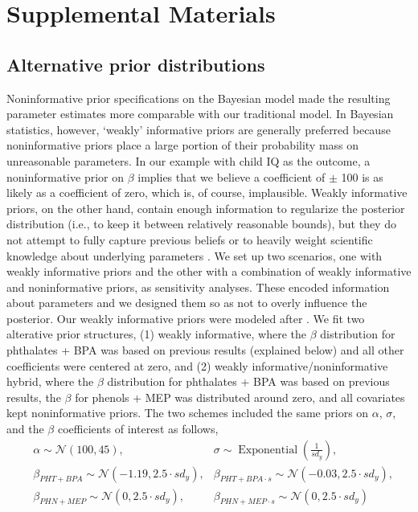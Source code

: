 \clearpage
{\setcounter{figure}{0} %
\setcounter{table}{0}
\renewcommand{\thefigure}{4.S.\arabic{figure}}
\renewcommand{\thetable}{4.S.\arabic{table}}
\section{Supplemental Materials}

\subsection{Alternative prior distributions}
\label{sec:priors}
Noninformative prior specifications on the Bayesian model made the resulting parameter estimates more comparable with our traditional model. In Bayesian statistics, however, `weakly' informative priors are generally preferred because noninformative priors place a large portion of their probability mass on unreasonable parameters. In our example with child IQ as the outcome, a noninformative prior on $\beta$ implies that we believe a coefficient of $\pm$ 100 is as likely as a coefficient of zero, which is, of course, implausible. Weakly informative priors, on the other hand, contain enough information to regularize the posterior distribution (i.e., to keep it between relatively reasonable bounds), but they do not attempt to fully capture previous beliefs or to heavily weight scientific knowledge about underlying parameters \cite{bda3}. We set up two scenarios, one with weakly informative priors and the other with a combination of weakly informative and noninformative priors, as sensitivity analyses. These encoded information about parameters and we designed them so as not to overly influence the posterior. Our weakly informative priors were modeled after \citet{gelman2020regression}. We fit two alterative prior structures, (1) weakly informative, where the $\beta$ distribution for phthalates + BPA was based on previous results (explained below) and all other coefficients were centered at zero, and (2) weakly informative/noninformative hybrid, where the $\beta$ distribution for phthalates + BPA was based on previous results, the $\beta$ for phenols + MEP was distributed around zero, and all covariates kept noninformative priors. The two schemes included the same priors on $\alpha$, $\sigma$, and the $\beta$ coefficients of interest as follows,
\begin{align*}
& \alpha \sim \mathcal{N}(100, 45), 
& \sigma \sim \operatorname{Exponential}(\frac{1}{sd_y}), \\
& \beta_{PHT+BPA} \sim \mathcal{N}(-1.19, 2.5 \cdot sd_y), 
& \beta_{PHT+BPA \cdot s} \sim \mathcal{N}(-0.03, 2.5 \cdot sd_y), \\
& \beta_{PHN+MEP} \sim \mathcal{N}(0, 2.5 \cdot sd_y), 
& \beta_{PHN+MEP \cdot s} \sim \mathcal{N}(0, 2.5 \cdot sd_y)
\end{align*}

}
